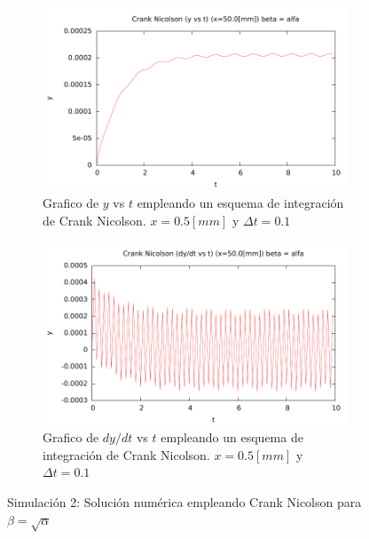 \begin{center}
\begin{figure} [H]
	\begin{subfigure}[b]{0.8\textwidth}
		\includegraphics{./parte3/graficos/grafico_cn_S2_y_b2.pdf}
		\caption{Grafico de $y$ vs $t$ empleando un esquema de integración de Crank Nicolson. $x=0.5[mm]$ y $\Delta t=0.1$}  
		\label{fig:cnS2b2_y}
	\end{subfigure}
	
	\begin{subfigure}[b]{0.8\textwidth}
		\includegraphics{./parte3/graficos/grafico_cn_S2_dy_b2.pdf}
		\caption{Grafico de $dy/dt$ vs $t$ empleando un esquema de integración de Crank Nicolson. $x=0.5[mm]$ y $\Delta t=0.1$} 
		\label{fig:cnS2b2_dy}
	\end{subfigure}
\caption{Simulación 2: Solución numérica empleando Crank Nicolson para $\beta=\sqrt{\alpha}$}
\end{figure}

\end{center}


\newpage